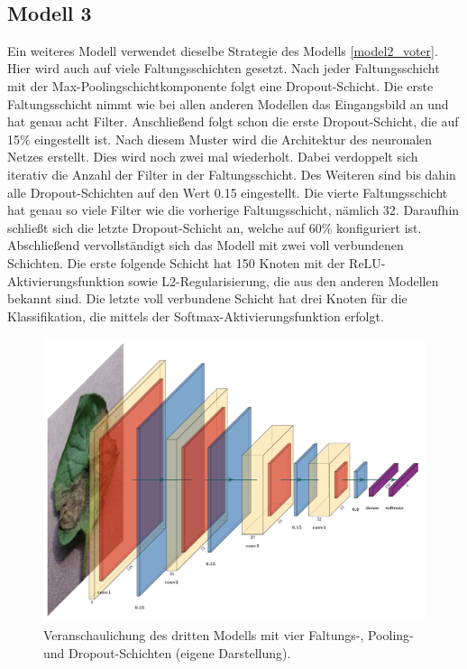 ~\newline
\subsection{Modell 3}
\label{model3_voter}

Ein weiteres Modell verwendet dieselbe Strategie des Modells \ref{model2_voter}. Hier wird auch auf viele Faltungsschichten gesetzt. Nach jeder Faltungsschicht mit der Max-Poolingschichtkomponente folgt eine Dropout-Schicht. Die erste Faltungsschicht nimmt wie bei allen anderen Modellen das Eingangsbild an und hat genau acht Filter. Anschließend folgt schon die erste Dropout-Schicht, die auf 15\% eingestellt ist. Nach diesem Muster wird die Architektur des neuronalen Netzes erstellt. Dies wird noch zwei mal wiederholt. Dabei verdoppelt sich iterativ die Anzahl der Filter in der Faltungsschicht. Des Weiteren sind bis dahin alle Dropout-Schichten auf den Wert 0.15 eingestellt. Die vierte Faltungsschicht hat genau so viele Filter wie die vorherige Faltungsschicht, nämlich 32. Daraufhin schließt sich die letzte Dropout-Schicht an, welche auf 60\% konfiguriert ist. Abschließend vervollständigt sich das Modell mit zwei voll verbundenen Schichten. Die erste folgende Schicht hat 150 Knoten mit der ReLU-Aktivierungsfunktion sowie L2-Regularisierung, die aus den anderen Modellen bekannt sind. Die letzte voll verbundene Schicht hat drei Knoten für die Klassifikation, die mittels der Softmax-Aktivierungsfunktion erfolgt.

\begin{figure}[h!]
	\centering
	\includegraphics[width=\textwidth]{bilder/voter3.pdf}
	\caption{Veranschaulichung des dritten Modells mit vier Faltungs-, Pooling- und Dropout-Schichten (eigene Darstellung).}
	\label{voter3}
\end{figure}




